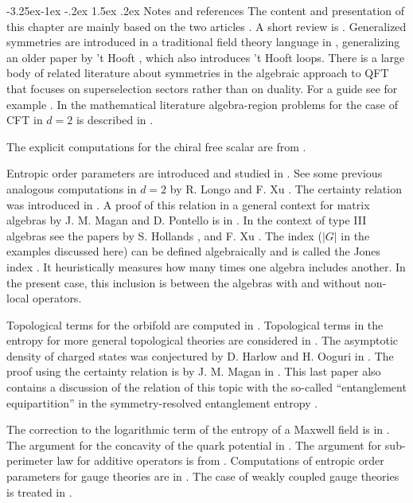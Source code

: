 \documentclass[11pt,a4paper]{article}
\makeatletter
\renewcommand\subsection{\@startsection{subsection}{2}{\z@}%
                                   {-3.25ex\@plus -1ex \@minus -.2ex}%
                                     {1.5ex \@plus .2ex}%
                                     {\normalfont\bfseries}}
\numberwithin{equation}{section}
\makeatother
\begin{document}
\subsection{Notes and references}
The content and presentation of this chapter are mainly based on the two articles \cite{casini2020entanglement,Casini:2020rgj}. A short review is \cite{Casini:2021zgr}. Generalized symmetries are introduced in a traditional field theory language in \cite{aharony2013reading}, generalizing an older paper by 't Hooft \cite{tHooft:1977nqb}, which also introduces 't Hooft loops.  There is a large body of related literature about symmetries in the algebraic approach to QFT that focuses on superselection sectors rather than on duality. For a guide see for example \cite{Haag:1992hx}. In the mathematical literature algebra-region problems for the case of CFT in $d=2$ is described in \cite{brunetti1993modular}.

The explicit computations for the chiral free scalar are from \cite{Arias:2018tmw}.

Entropic order parameters are introduced and studied in \cite{casini2020entanglement,Casini:2020rgj}. See some previous analogous computations in $d=2$ by R. Longo and F. Xu \cite{Longo:2017mbg}.  The certainty relation was introduced in \cite{casini2020entanglement}. A proof of this relation in a  general context for matrix algebras by J. M. Magan and D. Pontello is in \cite{magan2021quantum}. In the context of type III algebras see the papers by S. Hollands \cite{hollands2020variational}, and F. Xu \cite{xu2020relative}. The index ($|G|$ in the examples discussed here) can be defined algebraically and is called the Jones index \cite{Jones1983,KOSAKI1986123,cmp/1104179850}. It heuristically measures how many times one algebra includes another. In the present case, this inclusion is between the algebras with and without non-local operators.
    
 Topological terms for the orbifold are computed in \cite{casini2020entanglement}. Topological terms in the entropy for more general topological theories are considered in \cite{Kitaev:2005dm,Levin:2006zz}.  The asymptotic density of charged states was conjectured by D. Harlow and H. Ooguri in \cite{Harlow:2021trr}. The proof using the certainty relation is by J. M. Magan in \cite{Magan:2021myk}. This last paper also contains a discussion of the relation of this topic with the so-called ``entanglement equipartition'' in the symmetry-resolved entanglement entropy \cite{PhysRevB.98.041106,Murciano:2020vgh}. 
 
 The correction to the logarithmic term of the entropy of a Maxwell field is in \cite{casini2020logarithmic}. The argument for the concavity of the quark potential in \cite{bachas1986concavity}. The argument for sub-perimeter law for additive operators is from \cite{Casini:2020rgj}. 
Computations of entropic order parameters for gauge theories are in \cite{Casini:2020rgj}. The case of weakly coupled gauge theories is treated in \cite{Casini:2021tax}.
\newpage



{}

\end{document}
